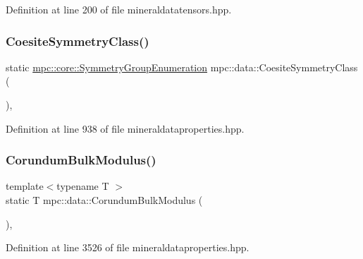 Definition at line 200 of file mineraldatatensors.\+hpp.

\mbox{\label{namespacempc_1_1data_ae379de7ea9a9a29e7c34687d65c29dca}} 
\subsubsection{\texorpdfstring{Coesite\+Symmetry\+Class()}{CoesiteSymmetryClass()}}
{\footnotesize\ttfamily static \mbox{\hyperlink{namespacempc_1_1core_a9d979684062547055a0ef5c13077bad8}{mpc\+::core\+::\+Symmetry\+Group\+Enumeration}} mpc\+::data\+::\+Coesite\+Symmetry\+Class (\begin{DoxyParamCaption}{ }\end{DoxyParamCaption})\hspace{0.3cm}{\ttfamily [inline]}, {\ttfamily [static]}}



Definition at line 938 of file mineraldataproperties.\+hpp.

\mbox{\label{namespacempc_1_1data_aeacfe6ea0b7b07ccedac4127c7b3c624}} 
\subsubsection{\texorpdfstring{Corundum\+Bulk\+Modulus()}{CorundumBulkModulus()}}
{\footnotesize\ttfamily template$<$typename T $>$ \\
static T mpc\+::data\+::\+Corundum\+Bulk\+Modulus (\begin{DoxyParamCaption}{ }\end{DoxyParamCaption})\hspace{0.3cm}{\ttfamily [inline]}, {\ttfamily [static]}}



Definition at line 3526 of file mineraldataproperties.\+hpp.

\mbox{\label{namespacempc_1_1data_ab2fd9437000ae59c1ac5fa3ea367aec6}} 
